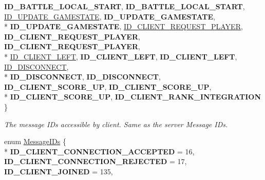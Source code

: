 \begin{DoxyCompactItemize}
{\bfseries I\-D\-\_\-\-B\-A\-T\-T\-L\-E\-\_\-\-L\-O\-C\-A\-L\-\_\-\-S\-T\-A\-R\-T}, 
{\bfseries I\-D\-\_\-\-B\-A\-T\-T\-L\-E\-\_\-\-L\-O\-C\-A\-L\-\_\-\-S\-T\-A\-R\-T}, 
\hyperlink{namespace_champ_net_plugin_a2ade5cfa7cf6c25ab7236c6b54a57821a6c390584862af2434c946e375365fe02}{I\-D\-\_\-\-U\-P\-D\-A\-T\-E\-\_\-\-G\-A\-M\-E\-S\-T\-A\-T\-E}, 
{\bfseries I\-D\-\_\-\-U\-P\-D\-A\-T\-E\-\_\-\-G\-A\-M\-E\-S\-T\-A\-T\-E}, 
\\*
{\bfseries I\-D\-\_\-\-U\-P\-D\-A\-T\-E\-\_\-\-G\-A\-M\-E\-S\-T\-A\-T\-E}, 
\hyperlink{namespace_champ_net_plugin_a2ade5cfa7cf6c25ab7236c6b54a57821a95ea635e1f4775e77d635b7039a9711e}{I\-D\-\_\-\-C\-L\-I\-E\-N\-T\-\_\-\-R\-E\-Q\-U\-E\-S\-T\-\_\-\-P\-L\-A\-Y\-E\-R}, 
{\bfseries I\-D\-\_\-\-C\-L\-I\-E\-N\-T\-\_\-\-R\-E\-Q\-U\-E\-S\-T\-\_\-\-P\-L\-A\-Y\-E\-R}, 
{\bfseries I\-D\-\_\-\-C\-L\-I\-E\-N\-T\-\_\-\-R\-E\-Q\-U\-E\-S\-T\-\_\-\-P\-L\-A\-Y\-E\-R}, 
\\*
\hyperlink{namespace_champ_net_plugin_a2ade5cfa7cf6c25ab7236c6b54a57821a170a6a655b34086567c4039a8e9ba81d}{I\-D\-\_\-\-C\-L\-I\-E\-N\-T\-\_\-\-L\-E\-F\-T}, 
{\bfseries I\-D\-\_\-\-C\-L\-I\-E\-N\-T\-\_\-\-L\-E\-F\-T}, 
{\bfseries I\-D\-\_\-\-C\-L\-I\-E\-N\-T\-\_\-\-L\-E\-F\-T}, 
\hyperlink{namespace_champ_net_plugin_a2ade5cfa7cf6c25ab7236c6b54a57821ab64ca706dd3c8029ea9dc9a239237e15}{I\-D\-\_\-\-D\-I\-S\-C\-O\-N\-N\-E\-C\-T}, 
\\*
{\bfseries I\-D\-\_\-\-D\-I\-S\-C\-O\-N\-N\-E\-C\-T}, 
{\bfseries I\-D\-\_\-\-D\-I\-S\-C\-O\-N\-N\-E\-C\-T}, 
{\bfseries I\-D\-\_\-\-C\-L\-I\-E\-N\-T\-\_\-\-S\-C\-O\-R\-E\-\_\-\-U\-P}, 
{\bfseries I\-D\-\_\-\-C\-L\-I\-E\-N\-T\-\_\-\-S\-C\-O\-R\-E\-\_\-\-U\-P}, 
\\*
{\bfseries I\-D\-\_\-\-C\-L\-I\-E\-N\-T\-\_\-\-S\-C\-O\-R\-E\-\_\-\-U\-P}, 
{\bfseries I\-D\-\_\-\-C\-L\-I\-E\-N\-T\-\_\-\-R\-A\-N\-K\-\_\-\-I\-N\-T\-E\-G\-R\-A\-T\-I\-O\-N}
 \}
\begin{DoxyCompactList}\small\item\em The message I\-Ds accessible by client. Same as the server Message I\-Ds. \end{DoxyCompactList}\item 
enum \hyperlink{namespace_champ_net_plugin_a2ade5cfa7cf6c25ab7236c6b54a57821}{Message\-I\-Ds} \{ \\*
{\bfseries I\-D\-\_\-\-C\-L\-I\-E\-N\-T\-\_\-\-C\-O\-N\-N\-E\-C\-T\-I\-O\-N\-\_\-\-A\-C\-C\-E\-P\-T\-E\-D} = 16, 
{\bfseries I\-D\-\_\-\-C\-L\-I\-E\-N\-T\-\_\-\-C\-O\-N\-N\-E\-C\-T\-I\-O\-N\-\_\-\-R\-E\-J\-E\-C\-T\-E\-D} = 17, 
{\bfseries I\-D\-\_\-\-C\-L\-I\-E\-N\-T\-\_\-\-J\-O\-I\-N\-E\-D} = 135, 

\end{DoxyCompactItemize}
